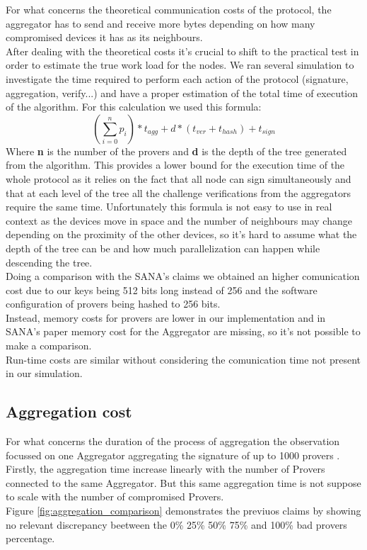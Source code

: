 For what concerns the theoretical communication costs of the protocol, 
the aggregator has to send and receive more bytes depending on how many compromised devices 
it has as its neighbours.\\

After dealing with the theoretical costs it's crucial to shift to the practical test in order to estimate the true work load for the nodes.
We ran several simulation to investigate the time required to perform each action of the protocol (signature, aggregation, verify...) and have a proper estimation of the total time of execution of the algorithm.
For this calculation we used this formula:
\[(\sum_{i=0}^{n} p_i) * t_{agg} + d * (t_{ver} + t_{hash}) + t_{sign} \]
Where \textbf{n} is the number of the provers and \textbf{d} is the depth of the tree generated from the algorithm.
This provides a lower bound for the execution time of the whole protocol as it relies on the fact that all node 
can sign simultaneously and that at each level of the tree all the challenge verifications from the aggregators require the same time.
Unfortunately this formula is not easy to use in real context as the devices move in space and the number of neighbours may change depending on the proximity of the other devices, so it's hard to assume what the depth of the tree can be and how much parallelization can happen while descending the tree.\\

Doing a comparison with the SANA's claims we obtained an higher comunication cost due to our keys being 512 bits long instead of 256 and the software configuration of provers being hashed to 256 bits.\\
Instead, memory costs for provers are lower in our implementation and in SANA's paper memory cost for the Aggregator are missing, so it's not possible to make a comparison.\\
Run-time costs are similar without considering the comunication time not present in our simulation.

\subsection{Aggregation cost}
For what concerns the duration of the process of aggregation the observation focussed on one Aggregator aggregating the signature of up to 1000 provers .
Firstly, the aggregation time increase linearly with the number of Provers connected to the same Aggregator.
But this same aggregation time is not suppose to scale with the number of compromised Provers.\\
Figure \ref{fig:aggregation_comparison} demonstrates the previuos claims by showing no relevant discrepancy beetween the 0\% 25\% 50\% 75\% and 100\% bad provers percentage.

